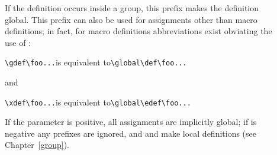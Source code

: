 \documentclass[letterpaper]{book}
\begin{document}
\begin{description}
\item []
If the definition occurs inside a  group, this prefix
makes the definition global.
This prefix can also be used for assignments other than
macro definitions; in fact,
for macro definitions abbreviations exist obviating the
use of :
\begin{disp}\verb>\gdef\foo...>\quad is equivalent to\quad \verb>\global\def\foo...>
\end{disp} and
\begin{disp}\verb>\xdef\foo...>\quad is equivalent to\quad \verb>\global\edef\foo...>
\end{disp}

If the parameter 
is positive, all assignments are
implicitly global;
if\handbreak {} is negative any  prefixes are
ignored,
and  and  make local definitions
(see Chapter~\ref{group}).


\end{description}
\end{document}

